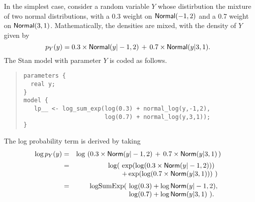 \documentclass[10pt]{report}
\newcommand{\Stan}{Stan\xspace}
\newcommand{\distro}[1]{\mbox{\sf #1}}
\begin{document}
In the simplest case, consider a random variable $Y$ whose
distirbution the mixture of two normal distributions, with a 0.3
weight on $\distro{Normal}(-1,2)$ and a 0.7 weight on
$\distro{Normal}(3,1)$.  Mathematically, the densities are mixed, with
the density of $Y$ given by
\[
p_Y(y) = 0.3 \times \distro{Normal}(y|-1,2) \, + \, 0.7 \times \distro{Normal}(y|3,1).
\]
%
The \Stan model with parameter $Y$ is coded as follows.
%
\begin{quote}
\begin{Verbatim}
parameters {
  real y;
}
model {
   lp__ <- log_sum_exp(log(0.3) + normal_log(y,-1,2),
                       log(0.7) + normal_log(y,3,1));
}
\end{Verbatim}
\end{quote}
%
The log probability term is derived by taking
\begin{eqnarray*}
\log p_Y(y) & = & \log \, \left( 0.3 \times \distro{Norm}(y|-1,2) \, + \,
  0.7 \times
  \distro{Norm}(y|3,1) \, \right)
\\[2pt]
& = & \log(\! \begin{array}[t]{l}
                 \exp(\log(0.3 \times \distro{Norm}(y|-1,2))) \\
                 + \exp(\log(0.7 \times \distro{Norm}(y|3,1))) \ )
              \end{array}
\\[2pt]
& = & \mbox{logSumExp}(\! \begin{array}[t]{l}
                         \log(0.3) + \log \distro{Norm}(y|-1,2),
                         \\                  
                         \log(0.7) + \log \distro{Norm}(y|3,1) \ ).
                       \end{array}
\end{eqnarray*}
\end{document}
